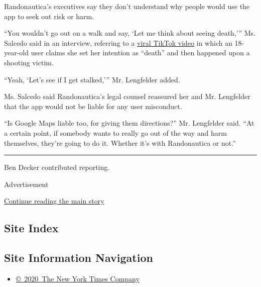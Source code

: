 Randonautica's executives say they don't understand why people would use
the app to seek out risk or harm.

``You wouldn't go out on a walk and say, `Let me think about seeing
death,''' Ms. Salcedo said in an interview, referring to a
\href{https://www.tiktok.com/@mykenarae/video/6842171161585945862}{viral
TikTok video} in which an 18-year-old user claims she set her intention
as ``death'' and then happened upon a shooting victim.

``Yeah, `Let's see if I get stalked,''' Mr. Lengfelder added.

Ms. Salcedo said Randonautica's legal counsel reassured her and Mr.
Lengfelder that the app would not be liable for any user misconduct.

``Is Google Maps liable too, for giving them directions?'' Mr.
Lengfelder said. ``At a certain point, if somebody wants to really go
out of the way and harm themselves, they're going to do it. Whether it's
with Randonautica or not.''

\begin{center}\rule{0.5\linewidth}{\linethickness}\end{center}

Ben Decker contributed reporting.

Advertisement

\protect\hyperlink{after-bottom}{Continue reading the main story}

\hypertarget{site-index}{%
\subsection{Site Index}\label{site-index}}

\hypertarget{site-information-navigation}{%
\subsection{Site Information
Navigation}\label{site-information-navigation}}

\begin{itemize}
\tightlist
\item
  \href{https://help.nytimes.com/hc/en-us/articles/115014792127-Copyright-notice}{©~2020~The
  New York Times Company}
\end{itemize}

